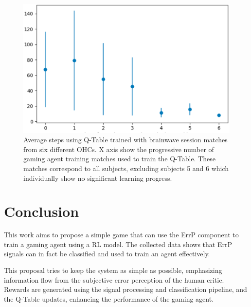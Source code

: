 \documentclass[journal]{IEEEtran}
\begin{document}
{{\begin{figure}[h!]
\centering
\includegraphics[scale=0.4]{Images/Average_steps/all.eps}
\caption{Average steps using Q-Table trained with brainwave session matches from six different OHCs. X axis show the progressive number of gaming agent training matches used to train the Q-Table. These matches correspond to all subjects, excluding subjects 5 and 6 which individually show no significant learning progress.}
\label{fig:avg_steps_all}
\end{figure}

\section{Conclusion}
\label{conclusions}


This work aims to propose a simple game that can use the ErrP component to train a gaming agent using a RL model. The collected data shows that ErrP signals can in fact be classified and used to train an agent effectively.

This proposal tries to keep the system as simple as possible, emphasizing information flow from the subjective error perception of the human critic. Rewards are generated using the signal processing and classification pipeline, and the Q-Table updates, enhancing the performance of the gaming agent.

}}
\end{document}
